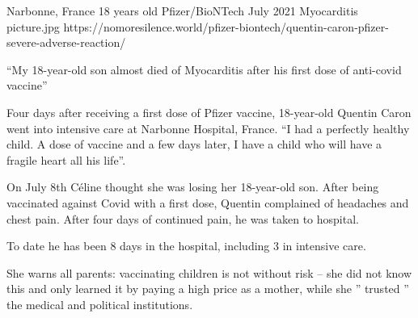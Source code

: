 {Narbonne, France}
{18 years old}
{Pfizer/BioNTech}
{July 2021}
{Myocarditis}
{picture.jpg}
{https://nomoresilence.world/pfizer-biontech/quentin-caron-pfizer-severe-adverse-reaction/}
{

“My 18-year-old son almost died of Myocarditis after his first dose of
anti-covid vaccine”

Four days after receiving a first dose of Pfizer vaccine, 18-year-old Quentin
Caron went into intensive care at Narbonne Hospital, France. “I had a perfectly
healthy child. A dose of vaccine and a few days later, I have a child who will
have a fragile heart all his life”.

On July 8th Céline thought she was losing her 18-year-old son. After being
vaccinated against Covid with a first dose, Quentin complained of headaches and
chest pain. After four days of continued pain, he was taken to hospital.

To date he has been 8 days in the hospital, including 3 in intensive care.

She warns all parents: vaccinating children is not without risk – she did not
know this and only learned it by paying a high price as a mother, while she ”
trusted ” the medical and political institutions.

}
